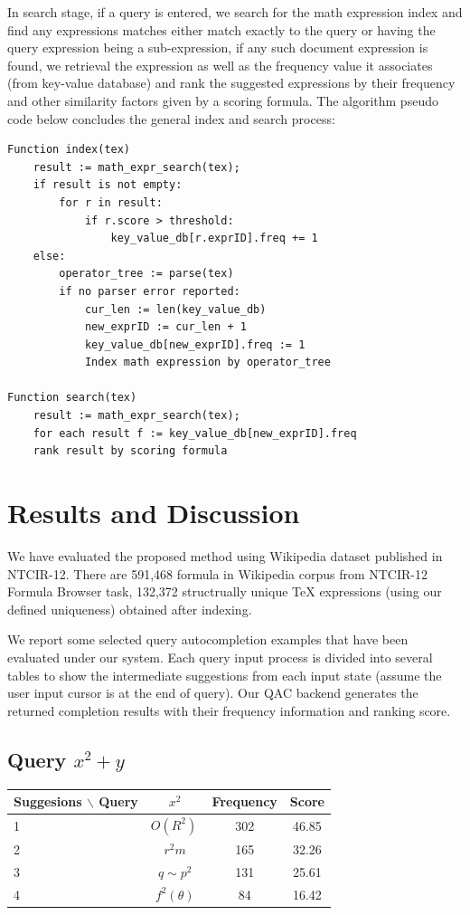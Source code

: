 \documentclass[12pt]{article} %
\begin{document}
In search stage, if a query is entered, we search for the math expression index and find any expressions
matches either match exactly to the query or having the query expression being a sub-expression, if any
such document expression is found, we retrieval the expression as well as the frequency value it
associates (from key-value database) and rank the suggested expressions by their frequency and other similarity factors given by a scoring formula.
%
The algorithm pseudo code below concludes the general index and search process:
\vspace{0.5cm}
\begin{lstlisting}
Function index(tex)
    result := math_expr_search(tex);
    if result is not empty:
        for r in result:
            if r.score > threshold:
                key_value_db[r.exprID].freq += 1
    else:
        operator_tree := parse(tex)
        if no parser error reported:
            cur_len := len(key_value_db)
            new_exprID := cur_len + 1
            key_value_db[new_exprID].freq := 1
            Index math expression by operator_tree

Function search(tex)
    result := math_expr_search(tex);
    for each result f := key_value_db[new_exprID].freq
    rank result by scoring formula
\end{lstlisting}

\section{Results and Discussion}
We have evaluated the proposed method using Wikipedia dataset published in NTCIR-12.
There are 591,468 formula in Wikipedia corpus from NTCIR-12 Formula Browser
task, 132,372 structrually unique TeX expressions (using our defined uniqueness) obtained
after indexing.

We report some selected query autocompletion examples that have been evaluated under our system.
Each query input process is divided into several tables to show the intermediate suggestions
from each input state (assume the user input cursor is at the end of query).
Our QAC backend generates the returned completion results with their frequency information and
ranking score.

\subsection{Query $x^2+y$}
\begin{center}
\begin{tabular}{lccc}
Suggesions $\backslash$ Query  & $x^2 $ & Frequency & Score \\
\hline
 1 &  $ O(R^{2})\,\! $ & 302 & 46.85 \\
 2 &  $ r^{2}m $ & 165 & 32.26 \\
 3 &  $ q\sim p^{2} $ & 131 & 25.61 \\
 4 &  $ f^{2}(\theta) $ & 84 & 16.42 \\
\end{tabular}
\end{center}
\end{document}
